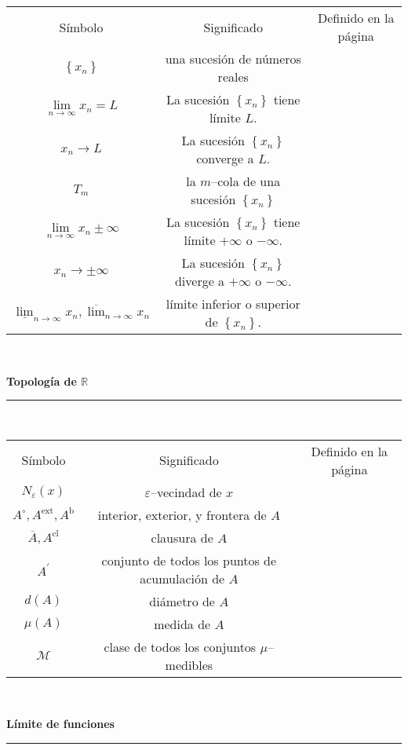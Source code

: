 \documentclass[a4,paper]{article}
\newcommand{\centrado}[1]{
	\ \\[.1\baselineskip]
	{\Large\bfseries\centering #1\par}
	\hrule
	\ \\[.1\baselineskip]
}
\begin{document}
\begin{tabular}{ccc}
	Símbolo & Significado & Definido en la página \\
	$\left\{x_{n}\right\}$ & una sucesión de números reales & \\
	$\lim\limits_{n\to\infty}x_{n}=L$ & La sucesión $\left\{x_{n}\right\}$ tiene límite $L$. & \\
	$x_{n}\rightarrow L$ & La sucesión $\left\{x_{n}\right\}$ converge a $L$. &\\
	$T_{m}$ & la $m$--cola de una sucesión $\left\{x_{n}\right\}$ & \\
	$\lim\limits_{n\to\infty}x_{n}\pm\infty$ & La sucesión $\left\{x_{n}\right\}$ tiene límite $+\infty$ o $-\infty$. &\\
	$x_{n}\rightarrow\pm\infty$ & La sucesión $\left\{x_{n}\right\}$ diverge a $+\infty$ o $-\infty$. &\\
	$\underline{\lim\limits}_{n\to\infty}x_{n},\overline{\lim\limits}_{n\to\infty}x_{n}$ & límite inferior o superior de $\left\{x_{n}\right\}$. & \\
\end{tabular}
\centrado{Topología de $\mathbb{R}$}
\begin{tabular}{ccc}
	Símbolo & Significado & Definido en la página \\
	$N_{\varepsilon}(x)$ & $\varepsilon$--vecindad de $x$ & \\
	$A^{\circ}, A^{\text{ext}},A^{\text{b}}$ & interior, exterior, y frontera de $A$ & \\
	$\overline{A},A^{\text{cl}}$ & clausura de $A$ & \\
	$A^{\prime}$ & conjunto de todos los puntos de acumulación de $A$ & \\
	$d(A)$ & diámetro de $A$ & \\
	$\mu(A)$ & medida de $A$ & \\
	$\mathcal{M}$ & clase de todos los conjuntos $\mu$--medibles & \\
\end{tabular}
\centrado{Límite de funciones}
\end{document}
